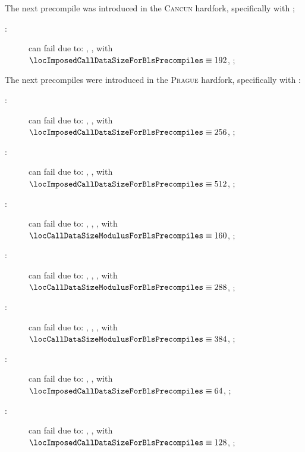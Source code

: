 The next precompile was introduced in the \textsc{Cancun} hardfork, specifically with \cite{EIP-4788};
\begin{description}
	\item[\instPointEvaluation:]
		can fail due to:
		\locBlsPrecompileFailureReasonGas,
		\locBlsPrecompileFailureReasonSize, with $\locImposedCallDataSizeForBlsPrecompiles \equiv 192$,
		\locBlsPrecompileFailureReasonData;
\end{description}
The next precompiles were introduced in the \textsc{Prague} hardfork, specifically with \cite{EIP-2537}:
\begin{description}
	\item[\instBlsGOneAdd{}:]
		can fail due to:
		\locBlsPrecompileFailureReasonGas,
		\locBlsPrecompileFailureReasonSize, with $\locImposedCallDataSizeForBlsPrecompiles \equiv 256$,
		\locBlsPrecompileFailureReasonData;
	\item[\instBlsGTwoAdd{}:]
		can fail due to:
		\locBlsPrecompileFailureReasonGas,
		\locBlsPrecompileFailureReasonSize, with $\locImposedCallDataSizeForBlsPrecompiles \equiv 512$,
		\locBlsPrecompileFailureReasonData;
	\item[\instBlsGOneMsm{}:]
		can fail due to:
		\locBlsPrecompileFailureReasonGas,
		\locBlsPrecompileFailureReasonEmpty,
		\locBlsPrecompileFailureReasonMod, with $\locCallDataSizeModulusForBlsPrecompiles \equiv 160$,
		\locBlsPrecompileFailureReasonData;
	\item[\instBlsGTwoMsm{}:]
		can fail due to:
		\locBlsPrecompileFailureReasonGas,
		\locBlsPrecompileFailureReasonEmpty,
		\locBlsPrecompileFailureReasonMod, with $\locCallDataSizeModulusForBlsPrecompiles \equiv 288$,
		\locBlsPrecompileFailureReasonData;
	\item[\instBlsPairingCheck{}:]
		can fail due to:
		\locBlsPrecompileFailureReasonGas,
		\locBlsPrecompileFailureReasonEmpty,
		\locBlsPrecompileFailureReasonMod, with $\locCallDataSizeModulusForBlsPrecompiles \equiv 384$,
		\locBlsPrecompileFailureReasonData;
	\item[\instBlsMapFpToGOne{}:]
		can fail due to:
		\locBlsPrecompileFailureReasonGas,
		\locBlsPrecompileFailureReasonSize, with $\locImposedCallDataSizeForBlsPrecompiles \equiv 64$,
		\locBlsPrecompileFailureReasonData;
	\item[\instBlsMapFpTwoToGTwo{}:]
		can fail due to:
		\locBlsPrecompileFailureReasonGas,
		\locBlsPrecompileFailureReasonSize, with $\locImposedCallDataSizeForBlsPrecompiles \equiv 128$,
		\locBlsPrecompileFailureReasonData;
\end{description}

